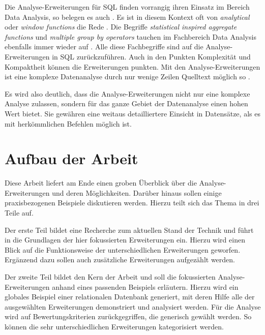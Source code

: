 Die Analyse-Erweiterungen für SQL finden vorrangig ihren Einsatz im Bereich Data
Analysis, so belegen es auch \citet[Kapitel 3]{FOTACHE2015243}. Es ist in diesem
Kontext oft von \textit{analytical} oder \textit{window functions} die Rede
\citep[Kapitel 3]{FOTACHE2015243}. Die Begriffe \textit{statistical inspired
aggregate functions} und \textit{multiple group by operators} tauchen im Fachbereich
Data Analysis ebenfalls immer wieder auf \citep[Kapitel 4.3]{FOTACHE2015243}.
Alle diese Fachbegriffe sind auf die Analyse-Erweiterungen in SQL zurückzuführen.
Auch in den Punkten Komplexität und Kompaktheit können die Erweiterungen punkten.
Mit den Analyse-Erweiterungen ist eine komplexe Datenanalyse durch nur wenige
Zeilen Quelltext möglich so \citet[Abstract]{Maue2022}.

Es wird also deutlich, dass die Analyse-Erweiterungen nicht nur eine komplexe Analyse
zulassen, sondern für das ganze Gebiet der Datenanalyse einen hohen Wert bietet.
Sie gewähren eine weitaus detailliertere Einsicht in Datensätze, als es mit
herkömmlichen Befehlen möglich ist.


\section{Aufbau der Arbeit}
\label{sec:aufbau_der_arbeit} Diese Arbeit liefert am Ende einen groben Überblick
über die Analyse-Erweiterungen und deren Möglichkeiten. Darüber hinaus sollen
einige praxisbezogenen Beispiele diskutieren werden. Hierzu teilt sich das Thema
in drei Teile auf.

Der erste Teil bildet eine Recherche zum aktuellen Stand der Technik und führt in
die Grundlagen der hier fokussierten Erweiterungen ein. Hierzu wird einen Blick
auf die Funktionsweise der unterschiedlichen Erweiterungen geworfen. Ergänzend dazu
sollen auch zusätzliche Erweiterungen aufgezählt werden.

Der zweite Teil bildet den Kern der Arbeit und soll die fokussierten Analyse-Erweiterungen
anhand eines passenden Beispiels erläutern. Hierzu wird ein globales Beispiel
einer relationalen Datenbank generiert, mit deren Hilfe alle der ausgewählten Erweiterungen
demonstriert und analysiert werden. Für die Analyse wird auf Bewertungskriterien
zurückgegriffen, die generisch gewählt werden. So können die sehr
unterschiedlichen Erweiterungen kategorisiert werden.

